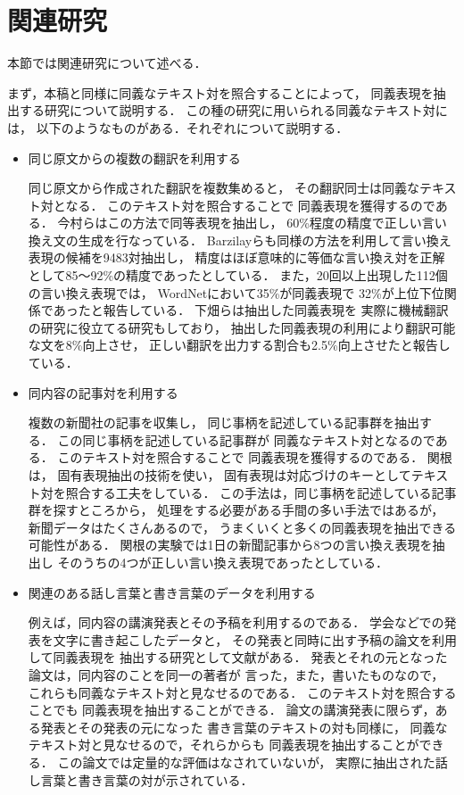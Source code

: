 \section{関連研究}

本節では関連研究について述べる．

まず，本稿と同様に同義なテキスト対を照合することによって，
同義表現を抽出する研究について説明する．
この種の研究に用いられる同義なテキスト対には，
以下のようなものがある．それぞれについて説明する．
\begin{itemize}
\item 
  同じ原文からの複数の翻訳を利用する

  同じ原文から作成された翻訳を複数集めると，
  その翻訳同士は同義なテキスト対となる．
  このテキスト対を照合することで
  同義表現を獲得するのである\cite{imamura_nlp2001ws_true,Barzilay:ACL01,shimohata_ipsj_iikae_mt}．
  今村ら\cite{imamura_nlp2001ws_true}はこの方法で同等表現を抽出し，
  60\%程度の精度で正しい言い換え文の生成を行なっている．
  Barzilayら\cite{Barzilay:ACL01}も同様の方法を利用して言い換え表現の候補を9483対抽出し，
  精度はほぼ意味的に等価な言い換え対を正解として85〜92\%の精度であったとしている．
  また，20回以上出現した112個の言い換え表現では，
  WordNetにおいて35\%が同義表現で
  32\%が上位下位関係であったと報告している．
  下畑ら\cite{shimohata_ipsj_iikae_mt}は抽出した同義表現を
  実際に機械翻訳の研究に役立てる研究もしており，
  抽出した同義表現の利用により翻訳可能な文を8\%向上させ，
  正しい翻訳を出力する割合も2.5\%向上させたと報告している．
  
\item 
  同内容の記事対を利用する

  複数の新聞社の記事を収集し，
  同じ事柄を記述している記事群を抽出する．
  この同じ事柄を記述している記事群が
  同義なテキスト対となるのである．
  このテキスト対を照合することで
  同義表現を獲得するのである\cite{sekine_nlp2001ws_true}．
  関根\cite{sekine_nlp2001ws_true}は，
  固有表現抽出の技術を使い，
  固有表現は対応づけのキーとしてテキスト対を照合する工夫をしている．
  この手法は，同じ事柄を記述している記事群を探すところから，
  処理をする必要がある手間の多い手法ではあるが，
  新聞データはたくさんあるので，
  うまくいくと多くの同義表現を抽出できる可能性がある．
  関根の実験では1日の新聞記事から8つの言い換え表現を抽出し
  そのうちの4つが正しい言い換え表現であったとしている．

\item 
  関連のある話し言葉と書き言葉のデータを利用する

  例えば，同内容の講演発表とその予稿を利用するのである．
  学会などでの発表を文字に書き起こしたデータと，
  その発表と同時に出す予稿の論文を利用して同義表現を
  抽出する研究として文献\cite{murata_kaiho_2001,murata_nl2001_henkei,Murata_spoken_written_lrec}がある．
  発表とそれの元となった論文は，同内容のことを同一の著者が
  言った，また，書いたものなので，
  これらも同義なテキスト対と見なせるのである．
  このテキスト対を照合することでも
  同義表現を抽出することができる．
  論文の講演発表に限らず，ある発表とその発表の元になった
  書き言葉のテキストの対も同様に，
  同義なテキスト対と見なせるので，それらからも
  同義表現を抽出することができる．
  この論文では定量的な評価はなされていないが，
  実際に抽出された話し言葉と書き言葉の対が示されている．


\end{itemize}
